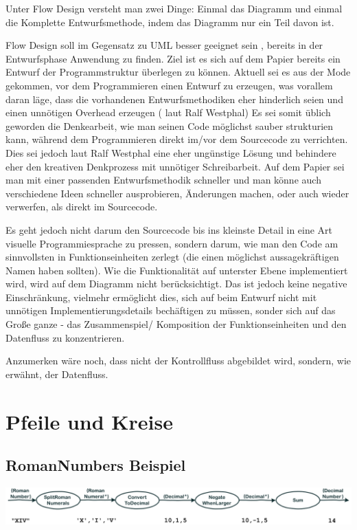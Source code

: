 \documentclass[11pt]{article}
\begin{document}
Unter Flow Design versteht man zwei Dinge:
Einmal das Diagramm und einmal die Komplette Entwurfsmethode, indem das
Diagramm nur ein Teil davon ist.

Flow Design soll im Gegensatz zu UML besser geeignet sein , bereits in der Entwurfsphase Anwendung zu finden.
Ziel ist es sich auf dem Papier bereits ein Entwurf der Programmstruktur überlegen zu können.
Aktuell sei es aus der Mode gekommen, vor dem Programmieren einen Entwurf zu erzeugen, was vorallem daran läge, dass die vorhandenen
Entwurfsmethodiken eher hinderlich seien und einen unnötigen Overhead erzeugen ( laut Ralf Westphal)
Es sei somit üblich geworden die Denkearbeit, wie man seinen Code möglichst sauber strukturien kann,
während dem Programmieren direkt im/vor dem Sourcecode zu verrichten.
Dies sei jedoch laut Ralf Westphal eine eher ungünstige Lösung und behindere eher den kreativen Denkprozess mit
unnötiger Schreibarbeit.
Auf dem Papier sei man mit einer passenden Entwurfsmethodik schneller und man könne auch verschiedene Ideen schneller
ausprobieren, Änderungen machen, oder auch wieder verwerfen, als direkt im Sourcecode.

Es geht jedoch nicht darum den Sourcecode bis ins kleinste Detail in eine Art visuelle Programmiesprache zu pressen,
sondern darum, wie man den Code am sinnvollsten in Funktionseinheiten zerlegt (die einen möglichst aussagekräftigen Namen haben sollten).
Wie die Funktionalität auf unterster Ebene implementiert wird, wird auf dem Diagramm nicht berücksichtigt.
Das ist jedoch keine negative Einschränkung, vielmehr ermöglicht dies, sich auf beim Entwurf nicht mit unnötigen Implementierungsdetails bechäftigen zu
müssen, sonder sich auf das Große ganze - das Zusammenspiel/ Komposition der Funktionseinheiten und den Datenfluss zu konzentrieren.

Anzumerken wäre noch, dass nicht der Kontrollfluss abgebildet wird, sondern, wie erwähnt, der Datenfluss.

\section{Pfeile und Kreise}
\label{sec:orgheadline4}
\subsection{RomanNumbers Beispiel}
\label{sec:orgheadline2}

\includegraphics[width=.9\linewidth]{./img/FromRomanNumerals.png}
\end{document}
